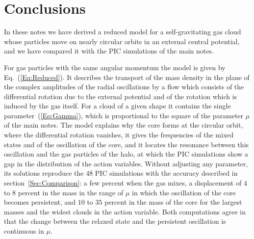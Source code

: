 \documentclass[prd,aps,nofootinbib,superscriptaddress,amsmath,amssymb]{revtex4}
\begin{document}
\section{Conclusions}
\label{Sec:Conclusions}

In these notes we have derived a reduced model for a self-gravitating gas cloud whose particles move on nearly circular orbits in an external central potential, and we have compared it with the PIC simulations of the main notes.

For gas particles with the same angular momentum the model is given by Eq.~(\ref{Eq:Reduced}). It describes the transport of the mass density in the plane of the complex amplitudes of the radial oscillations by a flow which consists of the differential rotation due to the external potential and of the rotation which is induced by the gas itself. For a cloud of a given shape it contains the single parameter~(\ref{Eq:Gamma}), which is proportional to the square of the parameter $\mu$ of the main notes. The model explains why the core forms at the circular orbit, where the differential rotation vanishes, it gives the frequencies of the mixed states and of the oscillation of the core, and it locates the resonance between this oscillation and the gas particles of the halo, at which the PIC simulations show a gap in the distribution of the action variables. Without adjusting any parameter, its solutions reproduce the $48$ PIC simulations with the accuracy described in section~\ref{Sec:Comparison}: a few percent when the gas mixes, a displacement of $4$ to $8$ percent in the mass in the range of $\mu$ in which the oscillation of the core becomes persistent, and $10$ to $35$ percent in the mass of the core for the largest masses and the widest clouds in the action variable. Both computations agree in that the change between the relaxed state and the persistent oscillation is continuous in $\mu$.
\end{document}
